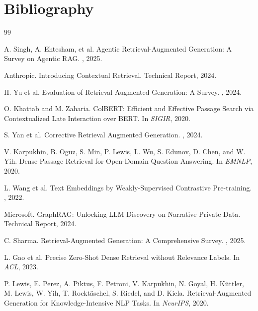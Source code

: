 \section*{Bibliography}

\begin{thebibliography}{99}

A. Singh, A. Ehtesham, et al.
\newblock Agentic Retrieval-Augmented Generation: A Survey on Agentic RAG.
, 2025.

Anthropic.
\newblock Introducing Contextual Retrieval.
\newblock Technical Report, 2024.

H. Yu et al.
\newblock Evaluation of Retrieval-Augmented Generation: A Survey.
, 2024.

O. Khattab and M. Zaharia.
\newblock ColBERT: Efficient and Effective Passage Search via Contextualized Late Interaction over BERT.
\newblock In {\em SIGIR}, 2020.

S. Yan et al.
\newblock Corrective Retrieval Augmented Generation.
, 2024.

V. Karpukhin, B. Oguz, S. Min, P. Lewis, L. Wu, S. Edunov, D. Chen, and W. Yih.
\newblock Dense Passage Retrieval for Open-Domain Question Answering.
\newblock In {\em EMNLP}, 2020.

L. Wang et al.
\newblock Text Embeddings by Weakly-Supervised Contrastive Pre-training.
, 2022.

Microsoft.
\newblock GraphRAG: Unlocking LLM Discovery on Narrative Private Data.
\newblock Technical Report, 2024.

C. Sharma.
\newblock Retrieval-Augmented Generation: A Comprehensive Survey.
, 2025.

L. Gao et al.
\newblock Precise Zero-Shot Dense Retrieval without Relevance Labels.
\newblock In {\em ACL}, 2023.

P. Lewis, E. Perez, A. Piktus, F. Petroni, V. Karpukhin, N. Goyal, H. Küttler, M. Lewis, W. Yih, T. Rocktäschel, S. Riedel, and D. Kiela.
\newblock Retrieval-Augmented Generation for Knowledge-Intensive NLP Tasks.
\newblock In {\em NeurIPS}, 2020.


\end{thebibliography}
